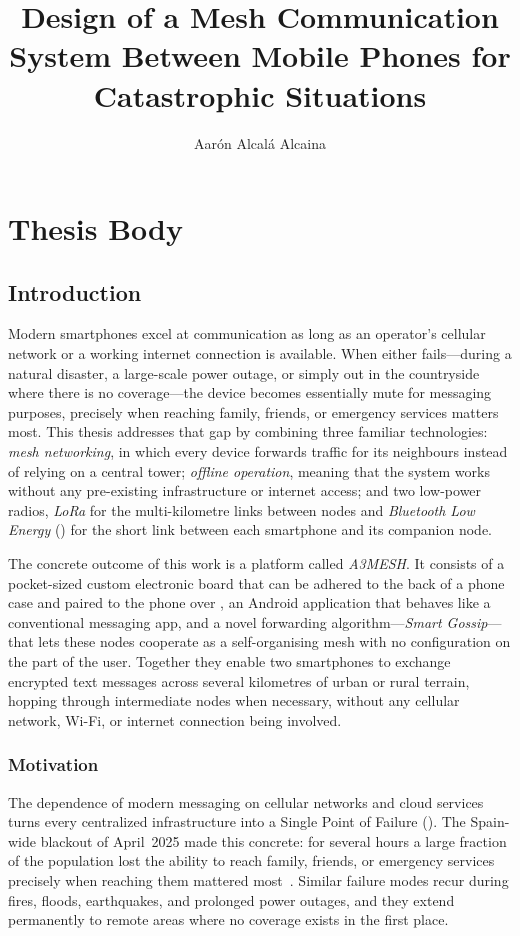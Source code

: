 \documentclass[english,bachelor]{tfgitic}[2026/01/22]
\title{Design of a Mesh Communication System Between Mobile Phones for Catastrophic Situations}
\author[m]{Aarón Alcalá Alcaina}
\begin{document}

\part{Thesis Body}
\label{part:thesis_body}

\chapter{Introduction}
\label{ch:introduction}

Modern smartphones excel at communication as long as an operator's cellular network or a working internet connection is available. When either fails---during a natural disaster, a large-scale power outage, or simply out in the countryside where there is no coverage---the device becomes essentially mute for messaging purposes, precisely when reaching family, friends, or emergency services matters most. This thesis addresses that gap by combining three familiar technologies: \emph{mesh networking}, in which every device forwards traffic for its neighbours instead of relying on a central tower; \emph{offline operation}, meaning that the system works without any pre-existing infrastructure or internet access; and two low-power radios, \emph{LoRa} for the multi-kilometre links between nodes and \emph{Bluetooth Low Energy} () for the short link between each smartphone and its companion node.

The concrete outcome of this work is a platform called \emph{A3MESH}. It consists of a pocket-sized custom electronic board that can be adhered to the back of a phone case and paired to the phone over , an Android application that behaves like a conventional messaging app, and a novel forwarding algorithm---\emph{Smart Gossip}---that lets these nodes cooperate as a self-organising mesh with no configuration on the part of the user. Together they enable two smartphones to exchange encrypted text messages across several kilometres of urban or rural terrain, hopping through intermediate nodes when necessary, without any cellular network, Wi-Fi, or internet connection being involved.

\section{Motivation}

The dependence of modern messaging on cellular networks and cloud services turns every centralized infrastructure into a Single Point of Failure (). The Spain-wide blackout of April~2025 made this concrete: for several hours a large fraction of the population lost the ability to reach family, friends, or emergency services precisely when reaching them mattered most~\cite{dsme_lora_2022}. Similar failure modes recur during fires, floods, earthquakes, and prolonged power outages, and they extend permanently to remote areas where no coverage exists in the first place.
\end{document}
